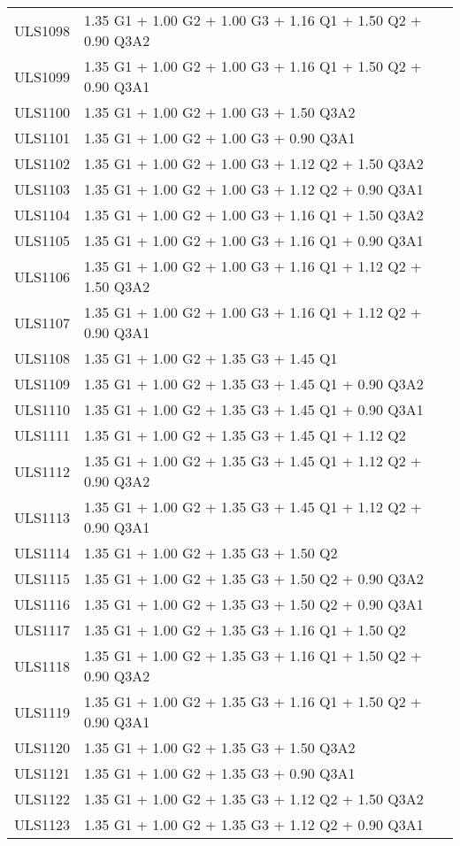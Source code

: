 \begin{center}
\begin{small}
\begin{longtable}{|l|p{10cm}|}
ULS1098 & 1.35 G1 + 1.00 G2 + 1.00 G3 + 1.16 Q1 + 1.50 Q2 + 0.90 Q3A2\\
ULS1099 & 1.35 G1 + 1.00 G2 + 1.00 G3 + 1.16 Q1 + 1.50 Q2 + 0.90 Q3A1\\
ULS1100 & 1.35 G1 + 1.00 G2 + 1.00 G3 + 1.50 Q3A2\\
ULS1101 & 1.35 G1 + 1.00 G2 + 1.00 G3 + 0.90 Q3A1\\
ULS1102 & 1.35 G1 + 1.00 G2 + 1.00 G3 + 1.12 Q2 + 1.50 Q3A2\\
ULS1103 & 1.35 G1 + 1.00 G2 + 1.00 G3 + 1.12 Q2 + 0.90 Q3A1\\
ULS1104 & 1.35 G1 + 1.00 G2 + 1.00 G3 + 1.16 Q1 + 1.50 Q3A2\\
ULS1105 & 1.35 G1 + 1.00 G2 + 1.00 G3 + 1.16 Q1 + 0.90 Q3A1\\
ULS1106 & 1.35 G1 + 1.00 G2 + 1.00 G3 + 1.16 Q1 + 1.12 Q2 + 1.50 Q3A2\\
ULS1107 & 1.35 G1 + 1.00 G2 + 1.00 G3 + 1.16 Q1 + 1.12 Q2 + 0.90 Q3A1\\
ULS1108 & 1.35 G1 + 1.00 G2 + 1.35 G3 + 1.45 Q1\\
ULS1109 & 1.35 G1 + 1.00 G2 + 1.35 G3 + 1.45 Q1 + 0.90 Q3A2\\
ULS1110 & 1.35 G1 + 1.00 G2 + 1.35 G3 + 1.45 Q1 + 0.90 Q3A1\\
ULS1111 & 1.35 G1 + 1.00 G2 + 1.35 G3 + 1.45 Q1 + 1.12 Q2\\
ULS1112 & 1.35 G1 + 1.00 G2 + 1.35 G3 + 1.45 Q1 + 1.12 Q2 + 0.90 Q3A2\\
ULS1113 & 1.35 G1 + 1.00 G2 + 1.35 G3 + 1.45 Q1 + 1.12 Q2 + 0.90 Q3A1\\
ULS1114 & 1.35 G1 + 1.00 G2 + 1.35 G3 + 1.50 Q2\\
ULS1115 & 1.35 G1 + 1.00 G2 + 1.35 G3 + 1.50 Q2 + 0.90 Q3A2\\
ULS1116 & 1.35 G1 + 1.00 G2 + 1.35 G3 + 1.50 Q2 + 0.90 Q3A1\\
ULS1117 & 1.35 G1 + 1.00 G2 + 1.35 G3 + 1.16 Q1 + 1.50 Q2\\
ULS1118 & 1.35 G1 + 1.00 G2 + 1.35 G3 + 1.16 Q1 + 1.50 Q2 + 0.90 Q3A2\\
ULS1119 & 1.35 G1 + 1.00 G2 + 1.35 G3 + 1.16 Q1 + 1.50 Q2 + 0.90 Q3A1\\
ULS1120 & 1.35 G1 + 1.00 G2 + 1.35 G3 + 1.50 Q3A2\\
ULS1121 & 1.35 G1 + 1.00 G2 + 1.35 G3 + 0.90 Q3A1\\
ULS1122 & 1.35 G1 + 1.00 G2 + 1.35 G3 + 1.12 Q2 + 1.50 Q3A2\\
ULS1123 & 1.35 G1 + 1.00 G2 + 1.35 G3 + 1.12 Q2 + 0.90 Q3A1\\

\end{longtable}
\end{small}
\end{center}
